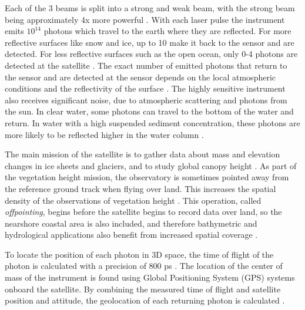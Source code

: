 \begin{figure}[htbp]
      \begin{floatrow}
      \end{floatrow}
\end{figure}

Each of the 3 beams is split into a strong and weak beam, with the strong beam being approximately 4x more powerful \parencite{Neumann2019d}. With each laser pulse the instrument emits \(10^{14}\) photons which travel to the earth where they are reflected. For more reflective surfaces like snow and ice, up to 10 make it back to the sensor and are detected. For less reflective surfaces such as the open ocean, only 0-4 photons are detected at the satellite \parencite{Neumann2019d}. The exact number of emitted photons that return to the sensor and are detected at the sensor depends on the local atmospheric conditions and the reflectivity of the surface \parencite{Neumann2019e}. The highly sensitive instrument also receives significant noise, due to atmospheric scattering and photons from the sun. In clear water, some photons can travel to the bottom of the water and return. In water with a high suspended sediment concentration, these photons are more likely to be reflected higher in the water column \parencite{Ranndal2021}.

The main mission of the satellite is to gather data about mass and elevation changes in ice sheets and glaciers, and to study global canopy height \parencite{Markus2017}. As part of the vegetation height mission, the observatory is sometimes pointed away from the reference ground track when flying over land. This increases the spatial density of the observations of vegetation height \parencite{Markus2017}. This operation, called \emph{offpointing}, begins before the satellite begins to record data over land, so the nearshore coastal area is also included, and therefore bathymetric and hydrological applications also benefit from increased spatial coverage \parencite{Magruder2021}.

To locate the position of each photon in 3D space, the time of flight of the photon is calculated with a precision of 800 ps \parencite{Neumann2019d}. The location of the center of mass of the instrument is found using Global Positioning System (GPS) systems onboard the satellite. By combining the measured time of flight and satellite position and attitude, the geolocation of each returning photon is calculated \parencite{Neumann2019d}.


